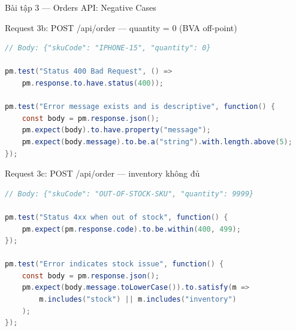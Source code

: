 \documentclass[aspectratio=169,10pt]{beamer}
\begin{document}
\begin{frame}[fragile]{Bài tập 3 --- Orders API: Negative Cases}
  \begin{block}{Request 3b: POST /api/order --- quantity = 0 (BVA off-point)}
\begin{lstlisting}[language=Java,style=nonumber]
// Body: {"skuCode": "IPHONE-15", "quantity": 0}

pm.test("Status 400 Bad Request", () =>
    pm.response.to.have.status(400));

pm.test("Error message exists and is descriptive", function() {
    const body = pm.response.json();
    pm.expect(body).to.have.property("message");
    pm.expect(body.message).to.be.a("string").with.length.above(5);
});
\end{lstlisting}
  \end{block}

  \begin{block}{Request 3c: POST /api/order --- inventory không đủ}
\begin{lstlisting}[language=Java,style=nonumber]
// Body: {"skuCode": "OUT-OF-STOCK-SKU", "quantity": 9999}

pm.test("Status 4xx when out of stock", function() {
    pm.expect(pm.response.code).to.be.within(400, 499);
});

pm.test("Error indicates stock issue", function() {
    const body = pm.response.json();
    pm.expect(body.message.toLowerCase()).to.satisfy(m =>
        m.includes("stock") || m.includes("inventory")
    );
});
\end{lstlisting}
  \end{block}
\end{frame}
\end{document}
